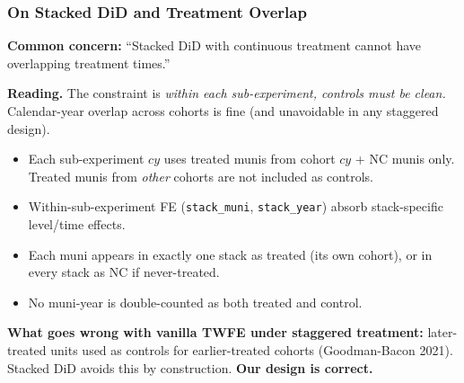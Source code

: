 \documentclass[xcolor = x11names, compress, aspectratio = 169]{beamer}
\begin{document}
    \begin{frame}
    \frametitle{On Stacked DiD and Treatment Overlap}
        \footnotesize
        \textbf{Common concern:} ``Stacked DiD with continuous treatment
        cannot have overlapping treatment times.''
        \medskip

        \textbf{Reading.} The constraint is \emph{within each sub-experiment,
        controls must be clean.} Calendar-year overlap across cohorts is fine
        (and unavoidable in any staggered design).
        \medskip

        \begin{itemize}\setlength{\itemsep}{0.05cm}\scriptsize
            \item Each sub-experiment $cy$ uses treated munis from cohort
            $cy$ + NC munis only. Treated munis from \emph{other} cohorts
            are not included as controls.
            \item Within-sub-experiment FE (\texttt{stack\_muni},
            \texttt{stack\_year}) absorb stack-specific level/time effects.
            \item Each muni appears in exactly one stack as treated (its own
            cohort), or in every stack as NC if never-treated.
            \item No muni-year is double-counted as both treated and control.
        \end{itemize}

        \textbf{What goes wrong with vanilla TWFE under staggered treatment:}
        later-treated units used as controls for earlier-treated cohorts
        (Goodman-Bacon 2021). Stacked DiD avoids this by construction.
        \textbf{Our design is correct.}
    \end{frame}
\end{document}
